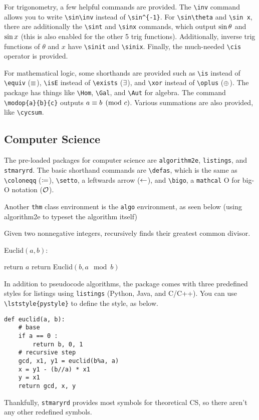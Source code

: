 \documentclass[11pt]{article}
\begin{document}
For trigonometry, a few helpful commands are provided. The \verb|\inv| command allows you to write \verb|\sin\inv| instead of \verb|\sin^{-1}|. For \verb|\sin\theta| and \verb|\sin x|, there are additionally the \verb|\sint| and \verb|\sinx| commands, which output $\sin\theta$ and $\sin x$ (this is also enabled for the other 5 trig functions). Additionally, inverse trig functions of $\theta$ and $x$ have \verb|\sinit| and \verb|\sinix|. Finally, the much-needed \verb|\cis| operator is provided.

For mathematical logic, some shorthands are provided such as \verb|\is| instead of \verb|\equiv| ($\equiv$), \verb|\isE| instead of \verb|\exists| ($\mathord{\exists}$), and \verb|\xor| instead of \verb|\oplus| ($\oplus$). The package has things like \verb|\Hom|, \verb|\Gal|, and \verb|\Aut| for algebra. The command \verb|\modop{a}{b}{c}| outputs $a \equiv b \pmod{c}$. Various summations are also provided, like \verb|\cycsum|.

\subsection{Computer Science}
The pre-loaded packages for computer science are \texttt{algorithm2e}, \texttt{listings}, and \texttt{stmaryrd}. The basic shorthand commands are \verb|\defas|, which is the same as \verb|\coloneqq| ($\coloneqq$), \verb|\setto|, a leftwards arrow ($\leftarrow$), and \verb|\bigo|, a \texttt{mathcal} O for big-O notation ($\mathcal{O}$).

Another \texttt{thm} class environment is the \texttt{algo} environment, as seen below (using algorithm2e to typeset the algorithm itself)
\begin{algo}
	Given two nonnegative integers, recursively finds their greatest common divisor.
	
	\begin{algorithm}[H]
    	Euclid$(a,b)$:
    	
      	{
        	return $a$
      	}
      	{
        	return Euclid$(b,a\mod b)$
      	}	
	\end{algorithm}
\end{algo}
In addition to pseudocode algorithms, the package comes with three predefined styles for listings using \texttt{listings} (Python, Java, and C/C++). You can use \verb|\lststyle{pystyle}| to define the style, as below.

\begin{lstlisting}[caption=Extended Euclidean Algorithm in Python]
def euclid(a, b):  
    # base  
    if a == 0 :   
        return b, 0, 1
    # recursive step
    gcd, x1, y1 = euclid(b%a, a)
    x = y1 - (b//a) * x1  
    y = x1  
    return gcd, x, y 
\end{lstlisting}
Thankfully, \texttt{stmaryrd} provides most symbols for theoretical CS, so there aren't any other redefined symbols.
\end{document}
